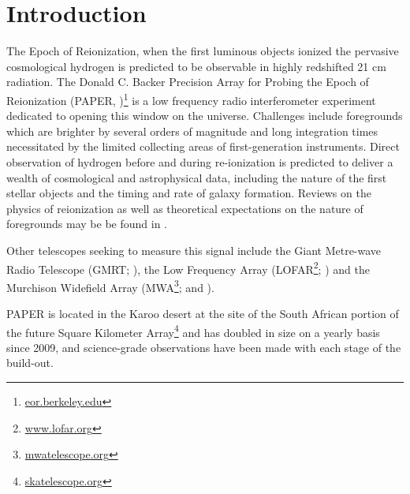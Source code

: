 \documentclass[preprint]{aastex}
\begin{document}


\section{Introduction}
The Epoch of Reionization, when the first luminous objects ionized the pervasive cosmological hydrogen is predicted to be observable in highly redshifted 21 cm radiation.  The Donald C. Backer Precision Array for Probing the Epoch of Reionization (PAPER, \cite{Parsons:2010p6757})\footnote{\url{eor.berkeley.edu}} is a low frequency radio interferometer experiment dedicated to opening this window on the universe.  Challenges include foregrounds which are brighter by several orders of magnitude and long integration times necessitated by the limited collecting areas of first-generation instruments. Direct observation of hydrogen before and during re-ionization is predicted to deliver a wealth of cosmological and astrophysical data, including the nature of the first stellar objects and the timing and rate of galaxy formation. Reviews on the physics of reionization as well as theoretical expectations on the nature of foregrounds may be be found in \citet{Furlanetto:2006p2267,Morales:2010p8093,Pritchard:2012p9555}.  

Other telescopes seeking to measure this signal include the Giant Metre-wave Radio Telescope (GMRT; \cite{Paciga:2013p9943}), the Low Frequency Array (LOFAR\footnote{\url{www.lofar.org}}; \cite{Yatawatta:2013p9699}) and the Murchison Widefield Array (MWA\footnote{\url{mwatelescope.org}}; \cite{Bowman:2013p9950} and \cite{Tingay:2013p9022}). 



PAPER is located in the Karoo desert at the site of the South African portion of the future Square Kilometer Array\footnote{\url{skatelescope.org}} and has doubled in size on a yearly basis since 2009, and science-grade observations have been made with each stage of the build-out.  
\end{document}
